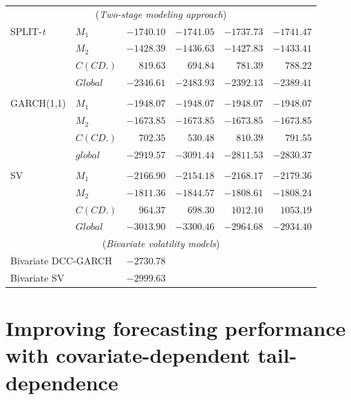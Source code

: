 \documentclass[10pt,aspectratio=169]{beamer}
\begin{document}
\begin{frame}
\begin{table}
\begin{center}
{\begin{tabular}{llrrrr}
      \multicolumn{6}{c}{(\emph{Two-stage modeling approach})}\\

      SPLIT-\emph{t}&$M_1$&$-1740.10$&$-1741.05$&$-1737.73$&$-1741.47$\\
      &$M_2$&$-1428.39$&$-1436.63$&$-1427.83$&$-1433.41$\\
      &$C(CD.)$&$819.63$&$694.84$&$781.39$&$788.22$\\
      &$Global$&${-2346.61}$&$-2483.93$&$-2392.13$&$-2389.41$\\

      \\
      GARCH(1,1)&$M_1$&$-1948.07$&$-1948.07$&$-1948.07$&$-1948.07$\\
      &$M_2$&$-1673.85$&$-1673.85$&$-1673.85$&$-1673.85$\\
      &$C(CD.)$&$702.35$&$530.48$&$810.39$&$791.55$\\
      &$global$&$-2919.57$&$$-3091.44$$&$-2811.53$&$-2830.37$\\
      \\
      SV&$M_1$&$-2166.90$&$-2154.18$&$-2168.17$&$-2179.36$\\
      &$M_2$&$-1811.36$&$-1844.57$&$-1808.61$&$-1808.24$\\
      &$C(CD.)$&$964.37$&$698.30$&$1012.10$&$1053.19$\\
      &$Global$&$-3013.90$&$-3300.46$&$-2964.68$&$-2934.40$\\

      \midrule
      \multicolumn{6}{c}{(\emph{Bivariate volatility models})}\\

      \multicolumn{2}{l}{Bivariate DCC-GARCH}&$-2730.78$&\\
      \multicolumn{2}{l}{Bivariate SV}&$-2999.63$&\\
      \bottomrule
    \end{tabular}
     }
  \end{center}

\end{table}

\end{frame}

\section{Improving forecasting performance with covariate-dependent tail-dependence}
\end{document}
